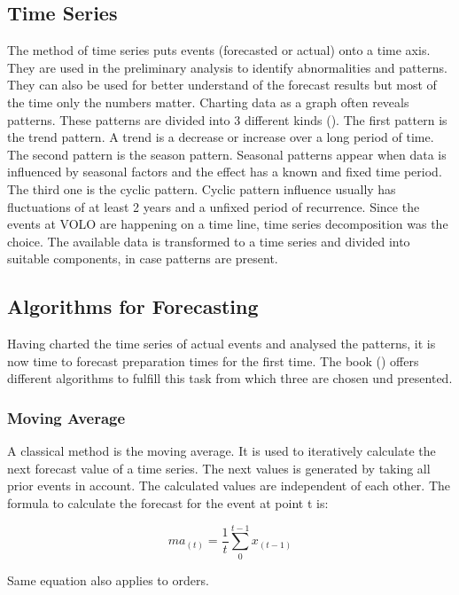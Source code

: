 \subsection{Time Series}\label{subsection:Time Series}
The method of time series puts events (forecasted or actual) onto a time axis.
They are used in the preliminary analysis to identify abnormalities and patterns. They can also be used for better understand of the forecast results but most of the time only the numbers matter. Charting data as a graph often reveals patterns. These patterns are divided into 3 different kinds (\cite{Hyndman.2013}). The first pattern is the trend pattern. A trend is a decrease or increase over a long period of time. The second pattern is the season pattern. Seasonal patterns appear when data is influenced by seasonal factors and the effect has a known and fixed time period. The third one is the cyclic pattern. Cyclic pattern influence usually has fluctuations of at least 2 years and a unfixed period of recurrence.\newline
Since the events at VOLO are happening on a time line, time series decomposition was the choice. The available data is transformed to a time series and divided into suitable components, in case patterns are present.
\subsection{Algorithms for Forecasting}\label{subsection:Algorithms for Forecasting}
Having charted the time series of actual events and analysed the patterns, it is now time to forecast preparation times for the first time. The book (\cite{Hyndman.2013}) offers different algorithms to fulfill this task from which three are chosen und presented.
\subsubsection{Moving Average}\label{subsubsection:Moving Average}
A classical method is the moving average. It is used to iteratively calculate the next forecast value of a time series. The next values is generated by taking all prior events in account. The calculated values are independent of each other. The formula to calculate the forecast for the event at point t is:
\begin{center}
\begin{equation}
ma_{(t)}= \frac{1}{t}\sum^{t-1}_0 x_{(t-1)}
\end{equation}
\end{center}
Same equation also applies to orders.

